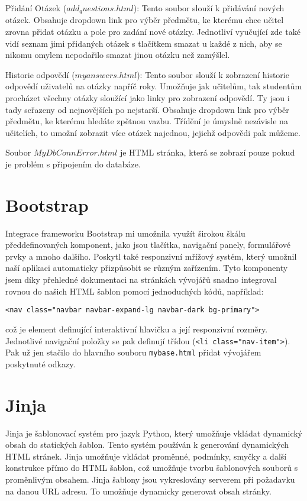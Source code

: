 \documentclass[11pt,a4paper,twoside,openright]{report}
\begin{document}
Přidání Otázek ($add_questions.html$): Tento soubor slouží k přidávání nových otázek. Obsahuje dropdown link pro výběr předmětu, ke kterému chce učitel zrovna přidat otázku a pole pro zadání nové otázky. Jednotliví vyučující zde také vidí seznam jimi přidaných otázek s tlačítkem smazat u každé z nich, aby se nikomu omylem nepodařilo smazat jinou otázku než zamýšlel.

Historie odpovědí ($myanswers.html$): Tento soubor slouží k zobrazení historie odpovědí uživatelů na otázky napříč roky. Umožňuje jak učitelům, tak studentům procházet všechny otázky sloužící jako linky pro zobrazení odpovědí. Ty jsou i tady seřazeny od nejnovějších po nejstarší. Obsahuje dropdown link pro výběr předmětu, ke kterému hledáte zpětnou vazbu. Třídění je úmyslně nezávisle na učitelích, to umožní zobrazit více otázek najednou, jejichž odpovědi pak můžeme.

Soubor $MyDbConnError.html$ je HTML stránka, která se zobrazí pouze pokud je problém s připojením do databáze.

\section{Bootstrap}

Integrace frameworku Bootstrap mi umožnila využít širokou škálu předdefinovaných komponent, jako jsou tlačítka, navigační panely, formulářové prvky a mnoho dalšího. Poskytl také responzivní mřížový systém, který umožnil naší aplikaci automaticky přizpůsobit se různým zařízením. Tyto komponenty jsem díky přehledné dokumentaci na stránkách vývojářů snadno integroval rovnou do našich HTML šablon pomocí jednoduchých kódů, například:
\begin{verbatim}
<nav class="navbar navbar-expand-lg navbar-dark bg-primary">
\end{verbatim}
což je element definující interaktivní hlavičku a její responzivní rozměry. Jednotlivé navigační položky se pak definují třídou (\texttt{<li class="nav-item">}). Pak už jen stačilo do hlavního souboru \texttt{mybase.html} přidat vývojářem poskytnuté odkazy.

\section{Jinja}
Jinja je šablonovací systém pro jazyk Python, který umožňuje vkládat dynamický obsah do statických šablon. Tento systém používán k generování dynamických HTML stránek. Jinja umožňuje vkládat proměnné, podmínky, smyčky a další konstrukce přímo do HTML šablon, což umožňuje tvorbu šablonových souborů s proměnlivým obsahem. Jinja šablony jsou vykreslovány serverem při požadavku na danou URL adresu. To umožňuje dynamicky generovat obsah stránky.
\end{document}
